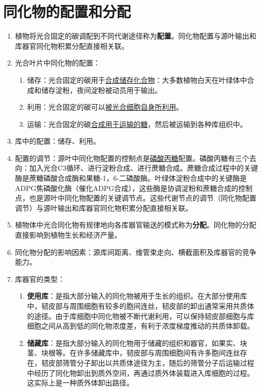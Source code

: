 \section{同化物的配置和分配}
\begin{enumerate}
    \item 植物将光合固定的碳调配到不同代谢途径称为\textbf{配置}。同化物配置与源叶输出和库器官同化物积累分配直接相关联。
    \item 光合叶片中同化物的配置：
    \begin{enumerate}
        \item 储存：光合固定的碳用于\uline{合成储存化合物}：大多数植物白天在叶绿体中合成和储存淀粉，夜间淀粉被动员用于输出。
        \item 利用：光合固定的碳可以\uline{被光合细胞自身所利用}。
        \item 运输：光合固定的碳\uline{合成用于运输的糖}，然后被运输到各种库组织中。
    \end{enumerate}
    \item 库中的配置：储存、利用。
    \item 配置的调节：源叶中同化物配置的控制点是\uline{磷酸丙糖}配置。磷酸丙糖有三个去向：加入光合C3循环、进行淀粉合成、进行蔗糖合成。蔗糖合成过程中的关键酶是蔗糖磷酸合成酶和果糖-1，6-二磷酸酶。叶绿体淀粉合成中的关键酶是ADPG焦磷酸化酶（催化ADPG合成），这些酶是协调淀粉和蔗糖合成的控制点，也是源叶中同化物配置的关键调节点。这些代谢节点的调节（同化物配置调节）与源叶输出和库器官同化物积累分配直接相关联。
    \item 植物体中光合同化物有规律地向各库器官输送的模式称为\textbf{分配}。同化物的分配直接影响到植物生长和经济产量。
    \item 同化物分配的影响因素：源库间距离、维管束走向、横截面积及库器官的竞争能力。
    \item 库器官的类型：
    \begin{enumerate}
        \item \textbf{使用库}：是指大部分输入的同化物被用于生长的组织。在大部分使用库中，韧皮部与周围细胞有较多的胞间连丝，韧皮部的卸出通常采用共质体的途径。由于库细胞中同化物被不断代谢利用，可以保持韧皮部细胞与库细胞之间从高到低的同化物浓度差，有利于浓度梯度推动的共质体卸载。
        \item \textbf{储藏库}：是指大部分输入的同化物用于储藏的组织和器官，如果实、块茎、块根等。在许多储藏库中，韧皮部与周围细胞间有许多胞间连丝存在，韧皮部筛管分子卸出以共质体途径为主，随后的筛管分子后运输过程中经历了同化物卸出到质外空间，再通过质外体装载进入库细胞的过程。这实际上是一种质外体卸出路径。
    \end{enumerate}

\end{enumerate}
